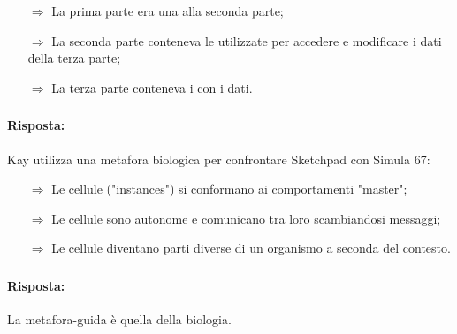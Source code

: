 \begin{itemize}
    \item [$\Rightarrow$] La prima parte era una  alla seconda parte;
    \item [$\Rightarrow$] La seconda parte conteneva le  utilizzate per accedere e modificare i dati della terza parte;
    \item [$\Rightarrow$] La terza parte conteneva i  con i dati.
\end{itemize}

\subsubsection{}


\paragraph{Risposta:} Kay utilizza una metafora biologica per confrontare Sketchpad con Simula 67:

\begin{itemize}
    \item [$\Rightarrow$] Le cellule ("instances") si conformano ai comportamenti "master";
    \item [$\Rightarrow$] Le cellule sono autonome e comunicano tra loro scambiandosi messaggi;
    \item [$\Rightarrow$] Le cellule diventano parti diverse di un organismo a seconda del contesto.
\end{itemize}

\subsubsection{}


\paragraph{Risposta:} La metafora-guida è quella della biologia.

\subsubsection{}

